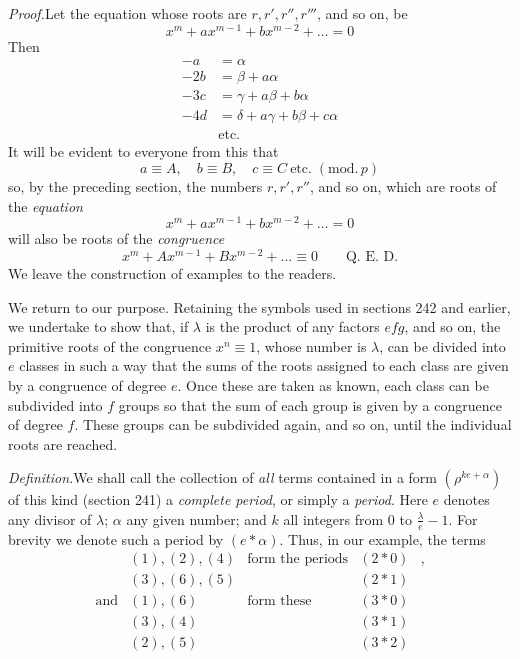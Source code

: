 \emph{Proof.}\quad Let the equation whose roots are $r,r',r'',r'''$, and so on, be
\[
x^m+ax^{m-1}+bx^{m-2}+\ldots=0
\]
Then
\[
\begin{aligned}
-a&=\alpha\\
-2b&=\beta+a\alpha\\
-3c&=\gamma+a\beta+b\alpha\\
-4d&=\delta+a\gamma+b\beta+c\alpha\\
&\text{etc.}
\end{aligned}
\]
It will be evident to everyone from this that
\[
a\equiv A,\quad b\equiv B,\quad c\equiv C\ \text{etc.}\;(\mathrm{mod.}\,p)
\]
so, by the preceding section, the numbers $r,r',r''$, and so on, which are roots of the \emph{equation}
\[
x^m+ax^{m-1}+bx^{m-2}+\ldots=0
\]
will also be roots of the \emph{congruence}
\[
x^m+Ax^{m-1}+Bx^{m-2}+\ldots\equiv0\qquad\text{Q. E. D.}
\]
We leave the construction of examples to the readers.

We return to our purpose. Retaining the symbols used in sections 242 and earlier, we undertake to show that, if $\lambda$ is the product of any factors
$efg$, and so on, the primitive roots of the congruence $x^n\equiv1$, whose number is $\lambda$, can be divided into $e$ classes in such a way that the sums of the roots assigned to each class are given by a congruence of degree $e$. Once these are taken as known, each class can be subdivided into $f$ groups so that the sum of each group is given by a congruence of degree $f$. These groups can be subdivided again, and so on, until the individual roots are reached.

\emph{Definition.}\quad We shall call the collection of \emph{all} terms contained in a form $(\rho^{ke+\alpha})$ of this kind (section 241) a \emph{complete period}, or simply a \emph{period}. Here $e$ denotes any divisor of $\lambda$; $\alpha$ any given number; and $k$ all integers from $0$ to $\frac{\lambda}{e}-1$. For brevity we denote such a period by $(e\ast\alpha)$. Thus, in our example, the terms
\[
\begin{array}{rclcl}
&(1),(2),(4)&\text{form the periods}&(2\ast0)&\text{,}\\
&(3),(6),(5)&&(2\ast1)&\\
\text{and}&(1),(6)&\text{form these}&(3\ast0)&\\
&(3),(4)&&(3\ast1)&\\
&(2),(5)&&(3\ast2)&
\end{array}
\]

